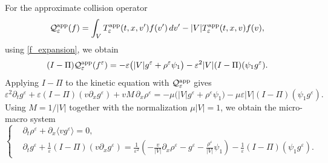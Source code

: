 \documentclass[11pt,twoside]{article}
\theoremstyle{plain}
\theoremstyle{nonumberplain}
\begin{document}
{For the approximate collision operator
\[
\mathcal{Q}_\varepsilon^{\rm app}(f)
=
\int_V T_\varepsilon^{\rm app}(t,x,v')f(v')\,dv'
-
|V|T_\varepsilon^{\rm app}(t,x,v)f(v),
\]
using \eqref{f_expansion}, we obtain
\[
(I-\Pi)\mathcal Q_\varepsilon^{\rm app}(f^\varepsilon)
=
-\varepsilon\bigl(|V|g^\varepsilon+\rho^\varepsilon\psi_1\bigr)
-\varepsilon^2|V|(I-\Pi)(\psi_1g^\varepsilon).
\]
Applying \(I-\Pi\) to the kinetic equation with
\(\mathcal Q_\varepsilon^{\rm app}\) gives
\[
\varepsilon^2 \partial_t g^\varepsilon
+
\varepsilon (I-\Pi)(v\partial_x g^\varepsilon)
+
vM\,\partial_x \rho^\varepsilon
=
-\mu\bigl(|V|g^\varepsilon+\rho^\varepsilon\psi_1\bigr)
-\mu\varepsilon |V|(I-\Pi)(\psi_1g^\varepsilon).
\]
Using \(M=1/|V|\) together with the normalization \(\mu |V|=1\), we obtain
the micro-macro system
\begin{equation}\label{eq:micro-macro-normalized}
\left\{
\begin{aligned}
&\partial_t \rho^\varepsilon
+\partial_x \langle v g^\varepsilon\rangle = 0,\\
&\partial_t g^\varepsilon
+\frac1\varepsilon (I-\Pi)(v\partial_x g^\varepsilon)
=
\frac1{\varepsilon^2}
\left(
-\frac{v}{|V|}\partial_x \rho^\varepsilon
-g^\varepsilon
-\frac{\rho^\varepsilon}{|V|}\psi_1
\right)
-\frac1\varepsilon (I-\Pi)(\psi_1g^\varepsilon).
\end{aligned}
\right.
\end{equation}

}
\end{document}
